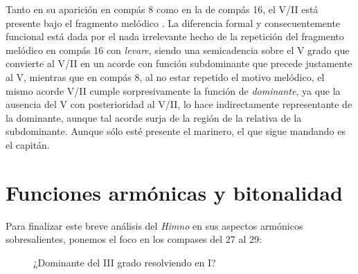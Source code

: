 Tanto en su aparición en compás 8 como en la de compás 16, el V/II está presente bajo el fragmento melódico . La diferencia formal y consecuentemente funcional está dada por el nada irrelevante hecho de la repetición del fragmento melódico en compás 16 con \emph{levare}, siendo  una semicadencia sobre el V grado que convierte al V/II en un acorde con función subdominante que precede justamente al V, mientras que en compás 8, al no estar repetido el motivo melódico, el mismo acorde V/II cumple sorpresivamente la función de \emph{dominante}, ya que la ausencia del V con posterioridad al V/II, lo hace indirectamente representante de la dominante, aunque tal acorde surja de la región de la relativa de la subdominante. Aunque sólo esté presente el marinero, el que sigue mandando es el capitán.

\section{Funciones armónicas y bitonalidad}
\label{sec:funciones-bitonalidad}

Para finalizar este breve análisis del \emph{Himno} en sus aspectos armónicos sobresalientes, ponemos el foco en los compases del 27 al 29:

\begin{figure}[H]
\centering
{}
\caption{¿Dominante del III grado resolviendo en I?}
\label{fig:V-III}
\end{figure}

